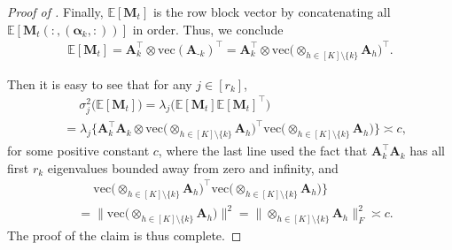 \documentclass[aos]{imsart}
\theoremstyle{plain}
\theoremstyle{definition}
\def\E{\mathbb{E}}
\def\bA{\mathbf{A}}
\def\bM{\mathbf{M}}
\def\balpha{\boldsymbol{\alpha}}
\def\trans{\intercal}
\def\vec{\mathrm{vec}}
\begin{document}
\begin{proof}[Proof of ]
Finally, $\E[\bM_t]$ is the row block vector by concatenating all $\E[\bM_t(:, (\balpha_k, :))]$ in order. Thus, we conclude
\begin{align*}
    \E[\bM_t] = \bA_k^\trans \otimes \vec(\bA_{\text{-}k})^\trans
    = \bA_k^\trans \otimes \vec\big( \otimes_{h\in[K] \setminus \{k\}} \bA_h \big)^\trans .
\end{align*}


Then it is easy to see that for any $j\in[r_k]$,
\begin{align*}
    &\;\quad
    \sigma_{j}^2\big( \E[\bM_t] \big) = \lambda_{j}\big( \E[\bM_t] \E[\bM_t]^\trans \big) \\
    &=
    \lambda_{j}\Big\{ \bA_k^\trans \bA_k \otimes \vec\big( \otimes_{h\in[K] \setminus \{k\}} \bA_h \big)^\trans \vec\big( \otimes_{h\in[K] \setminus \{k\}} \bA_h \big) \Big\}
    \asymp c ,
\end{align*}
for some positive constant $c$, where the last line used the fact that $\bA_k^\trans \bA_k$ has all first $r_k$ eigenvalues bounded away from zero and infinity, and
\begin{align*}
    &\;\quad
    \vec\big( \otimes_{h\in[K] \setminus \{k\}} \bA_h \big)^\trans \vec\big( \otimes_{h\in[K] \setminus \{k\}} \bA_h \big) \Big\} \\
    &=
    \Big\| \vec\big( \otimes_{h\in[K] \setminus \{k\}} \bA_h \big) \Big\|^2
    = \Big\| \otimes_{h\in[K] \setminus \{k\}} \bA_h \Big\|_F^2 \asymp c .
\end{align*}
The proof of the claim is thus complete.
\end{proof}
\end{document}
